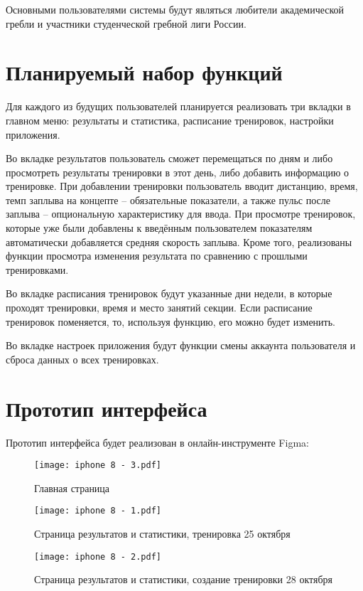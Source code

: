 \documentclass[14pt]{extreport}
\begin{document}
Основными пользователями системы будут являться любители академической гребли и участники студенческой гребной лиги России.

\section{Планируемый набор функций}

Для каждого из будущих пользователей планируется реализовать три вкладки в главном меню: результаты и статистика, расписание тренировок, настройки приложения.

Во вкладке результатов пользователь сможет перемещаться по дням и либо просмотреть результаты тренировки в этот день, либо добавить информацию о тренировке. При добавлении тренировки пользователь вводит дистанцию, время, темп заплыва на концепте – обязательные показатели, а также пульс после заплыва – опциональную характеристику для ввода. При просмотре тренировок, которые уже были добавлены к введённым пользователем показателям автоматически добавляется средняя скорость заплыва. Кроме того, реализованы функции просмотра изменения результата по сравнению с прошлыми тренировками.

Во вкладке расписания тренировок будут указанные дни недели, в которые проходят тренировки, время и место занятий секции. Если расписание тренировок поменяется, то, используя функцию, его можно будет изменить.

Во вкладке настроек приложения будут функции смены аккаунта пользователя и сброса данных о всех тренировках.

\section{Прототип интерфейса}

Прототип интерфейса будет реализован в онлайн-инструменте Figma:

\begin{figure}[H]
\centerline{\texttt{[image: iphone 8 - 3.pdf]}}
\caption{Главная страница}
\label{fig11}
\end{figure}

\begin{figure}[H]
\centerline{\texttt{[image: iphone 8 - 1.pdf]}}
\caption{Страница результатов и статистики, тренировка 25 октября}
\label{fig12}
\end{figure}

\begin{figure}[H]
\centerline{\texttt{[image: iphone 8 - 2.pdf]}}
\caption{Страница результатов и статистики, создание тренировки 28 октября}
\label{fig13}
\end{figure}
\end{document}
